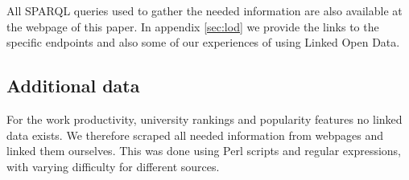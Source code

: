 \noindent All SPARQL queries used to gather the needed information are also available at the webpage of this paper.
In appendix \ref{sec:lod} we provide the links to the specific endpoints and also some of our experiences of using Linked Open Data.

\subsection{Additional data}
\label{ssec:additional}

For the work productivity, university rankings and popularity features no linked data exists. We therefore scraped all needed information from webpages and linked them ourselves. This was done using Perl scripts and regular expressions, with varying difficulty for different sources.


